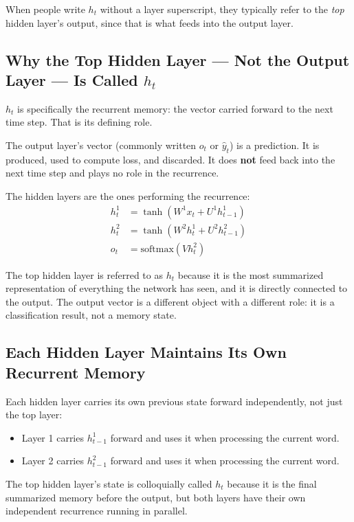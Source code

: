 \documentclass[12pt,a4paper]{article}
\begin{document}
When people write $h_t$ without a layer superscript, they typically refer to the \textit{top} hidden layer's output, since that is what feeds into the output layer.

\subsection{Why the Top Hidden Layer --- Not the Output Layer --- Is Called $h_t$}
$h_t$ is specifically the recurrent memory: the vector carried forward to the next time step. That is its defining role.

The output layer's vector (commonly written $o_t$ or $\hat{y}_t$) is a prediction. It is produced, used to compute loss, and discarded. It does \textbf{not} feed back into the next time step and plays no role in the recurrence.

The hidden layers are the ones performing the recurrence:
\begin{align*}
    h^1_t &= \tanh\!\left(W^1 x_t + U^1 h^1_{t-1}\right) \\
    h^2_t &= \tanh\!\left(W^2 h^1_t + U^2 h^2_{t-1}\right) \\
    o_t   &= \text{softmax}\!\left(V h^2_t\right)
\end{align*}

The top hidden layer is referred to as $h_t$ because it is the most summarized representation of everything the network has seen, and it is directly connected to the output. The output vector is a different object with a different role: it is a classification result, not a memory state.

\subsection{Each Hidden Layer Maintains Its Own Recurrent Memory}
Each hidden layer carries its own previous state forward independently, not just the top layer:
\begin{itemize}
    \item Layer 1 carries $h^1_{t-1}$ forward and uses it when processing the current word.
    \item Layer 2 carries $h^2_{t-1}$ forward and uses it when processing the current word.
\end{itemize}

The top hidden layer's state is colloquially called $h_t$ because it is the final summarized memory before the output, but both layers have their own independent recurrence running in parallel.
\end{document}
